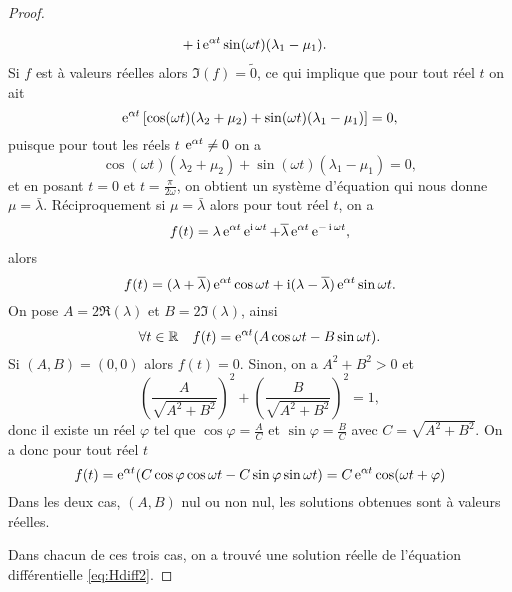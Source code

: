 \begin{proof}
\begin{enumerate}
\begin{align}
            &+ \operatorname{i}\operatorname{e}^{\alpha t} \sin(\omega t)(\lambda_1-\mu_1).
      \end{align}
      Si \(f\) est à valeurs réelles alors \(\Im(f) = \tilde{0}\), ce qui
      implique que pour tout réel \(t\) on ait
      \begin{equation}
        \operatorname{e}^{\alpha t} \left[ \cos(\omega t) (\lambda_2 + \mu_2)+
        \sin(\omega t)(\lambda_1-\mu_1)\right] = 0,
      \end{equation}
      puisque pour tout les réels \(t\) \(\operatorname{e}^{\alpha t} \neq 0\) on a
      \begin{equation}
        \cos(\omega t) (\lambda_2 + \mu_2)+ \sin(\omega t)(\lambda_1-\mu_1) = 0,
      \end{equation}
      et en posant \(t = 0\) et \(t = \frac{\pi}{2 \omega}\), on obtient
      un système d'équation qui nous donne \(\mu = \bar{\lambda}\).
      Réciproquement si \(\mu = \bar{\lambda}\) alors pour tout réel \(t\), on a
      \begin{equation}
        f(t) = \lambda \operatorname{e}^{\alpha t} \operatorname{e}^{\operatorname{i} \omega t} + \overline{\lambda}
        \operatorname{e}^{\alpha t} \operatorname{e}^{-\operatorname{i}\omega t},
      \end{equation}
      alors
      \begin{equation}
        f(t) = (\lambda + \overline{\lambda}) \operatorname{e}^{\alpha t} \cos \omega t +
        \operatorname{i}(\lambda - \overline{\lambda}) \operatorname{e}^{\alpha t}\sin \omega t.
      \end{equation}
      On pose \(A = 2 \Re(\lambda)\) et  \(B = 2\Im(\lambda)\), ainsi
      \begin{equation}
        \forall t \in \mathbb{R} \quad f(t) = \operatorname{e}^{\alpha t} (A \cos \omega t -B
        \sin \omega t).
      \end{equation}
      Si \((A,B) = (0,0)\) alors \(f(t) = 0\). Sinon, on a \(A^2 + B^2>0\) et
      \begin{equation}
        \left(\dfrac{A}{\sqrt{A^2 + B^2}} \right)^2 +
        \left(\dfrac{B}{\sqrt{A^2 + B^2}} \right)^2 = 1,
      \end{equation}
      donc il existe un réel \(\varphi\) tel que \(\cos \varphi =
      \frac{A}{C}\) et \(\sin \varphi = \frac{B}{C}\) avec \(C = \sqrt{A^2
      + B^2}\). On a donc pour tout réel \(t\)
      \begin{equation}
        f(t) = \operatorname{e}^{\alpha t} (C \cos \varphi \cos \omega t - C \sin
        \varphi \sin \omega t) = C \operatorname{e}^{\alpha t} \cos(\omega t +
        \varphi)
      \end{equation}
      Dans les deux cas, \((A, B)\) nul ou non nul, les solutions obtenues
      sont à valeurs réelles.
  \end{enumerate}
  Dans chacun de ces trois cas, on a trouvé une solution réelle de l'équation
  différentielle \eqref{eq:Hdiff2}.
\end{proof}


